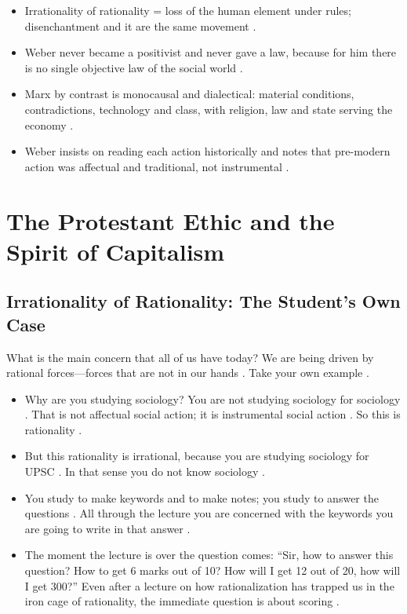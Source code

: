 \begin{QuickRevision}
\begin{itemize}
    \item Irrationality of rationality = loss of the human element under rules; disenchantment and it are the same movement .
    \item Weber never became a positivist and never gave a law, because for him there is no single objective law of the social world .
    \item Marx by contrast is monocausal and dialectical: material conditions, contradictions, technology and class, with religion, law and state serving the economy .
    \item Weber insists on reading each action historically and notes that pre-modern action was affectual and traditional, not instrumental .
\end{itemize}
\end{QuickRevision}

\sectiondivider

\section{The Protestant Ethic and the Spirit of Capitalism}

\subsection{Irrationality of Rationality: The Student's Own Case}
What is the main concern that all of us have today? We are being driven by rational forces---forces that are not in our hands . Take your own example .
\begin{itemize}
    \item Why are you studying sociology? You are not studying sociology for sociology . That is not affectual social action; it is instrumental social action . So this is rationality .
    \item But this rationality is irrational, because you are studying sociology for UPSC . In that sense you do not know sociology .
    \item You study to make keywords and to make notes; you study to answer the questions . All through the lecture you are concerned with the keywords you are going to write in that answer .
    \item The moment the lecture is over the question comes: ``Sir, how to answer this question? How to get 6 marks out of 10? How will I get 12 out of 20, how will I get 300?'' Even after a lecture on how rationalization has trapped us in the iron cage of rationality, the immediate question is about scoring .
\end{itemize}

